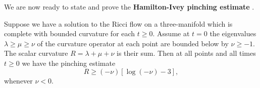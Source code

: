 We are now ready to state and prove the \textbf{Hamilton-Ivey
pinching estimate} .

\begin{theorem}
  \label{thm:cz-hamiltonivey-curvature-pinching}
Suppose we have a solution to the Ricci flow on a three-manifold
which is complete with bounded curvature for each $t\geq0$. Assume
at $t=0$ the eigenvalues $\lambda\geq\mu\geq\nu$ of the curvature
operator at each point are bounded below by $\nu\geq-1$. The
scalar curvature $R=\lambda+\mu+\nu$ is their sum. Then at all
points and all times $t\geq0$ we have the pinching estimate
$$
R\geq (-\nu)[\log(-\nu)-3],
$$
whenever $\nu<0$.
\end{theorem}

